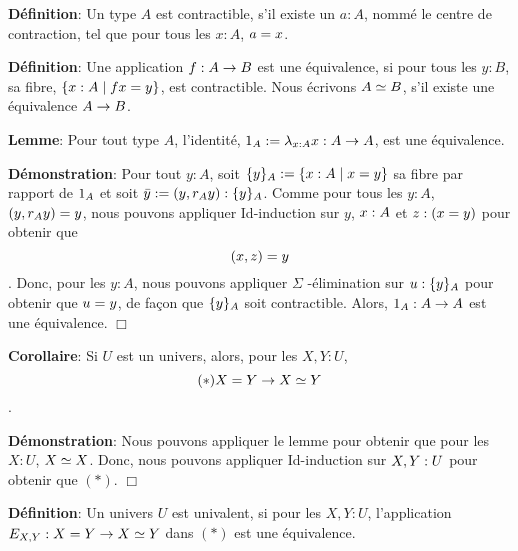 \documentclass{article}
\begin{document}
 
 
 \textbf{Définition}:
 Un type $A$ est contractible, s'il existe un $a : A$, nommé le centre de contraction, tel que pour tous les $x : A$, $a = x$.
 
 \textbf{Définition}:
 Une application $f : A \rightarrow B$ est une équivalence, si pour tous les $y : B$, sa fibre, $\{ x : A \mid f x = y \}$, est contractible.
 Nous écrivons $A \simeq B$, s'il existe une équivalence $A \rightarrow B$.
 
 \textbf{Lemme}:
 Pour tout type $A$, l'identité, $1_{ A } := \lambda_{x : A} x : A \rightarrow A$, est une équivalence.
 
 \textbf{Démonstration}:
 Pour tout $y : A$, soit $\{ y \}_{ A } := \{ x : A \mid x = y \}$ sa fibre par rapport de $1_{ A }$ et soit $\bar{ y } := ( y , r_{ A } y ) : \{ y \}_{ A }$.
 Comme pour tous les $y : A$, $( y , r_{ A } y ) = y$, nous pouvons appliquer Id-induction sur $y$, $x : A$ et $z : ( x = y )$ pour obtenir que \[( x , z ) = y\].
 Donc, pour les $y : A$, nous pouvons appliquer $\Sigma$ -élimination sur $u : \{ y \}_{ A }$ pour obtenir que $u = y$, de façon que $\{ y \}_{ A }$ soit contractible.
 Alors, $1_{ A } : A \rightarrow A$ est une équivalence.
  $\Box$ 
 
 \textbf{Corollaire}:
 Si $U$ est un univers, alors, pour les $X , Y : U$, \[(*)X = Y \rightarrow X \simeq Y\].
 
 \textbf{Démonstration}:
 Nous pouvons appliquer le lemme pour obtenir que pour les $X : U$, $X \simeq X$.
 Donc, nous pouvons appliquer Id-induction sur $X , Y : U$ pour obtenir que $(*)$.
  $\Box$ 
 
 
 \textbf{Définition}:
 Un univers $U$ est univalent, si pour les $X , Y : U$, l'application $E_ { X , Y }: X = Y \rightarrow X \simeq Y$ dans $(*)$ est une équivalence.
 
 
\end{document}
